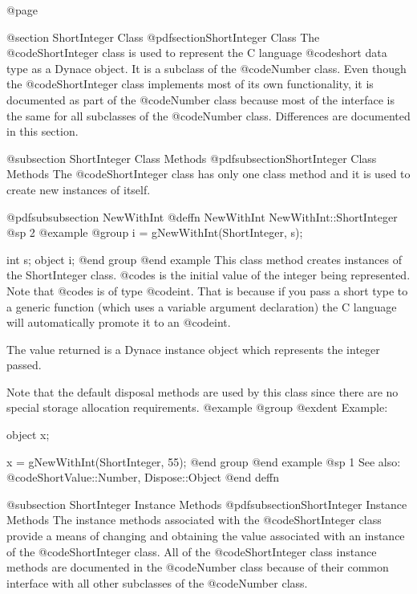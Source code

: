 @page

@section ShortInteger Class
@pdfsection{ShortInteger Class}
The @code{ShortInteger} class is used to represent the C language
@code{short} data type as a Dynace object.  It is a subclass of the
@code{Number} class.  Even though the @code{ShortInteger} class
implements most of its own functionality, it is documented as part of
the @code{Number} class because most of the interface is the same for
all subclasses of the @code{Number} class.  Differences are documented
in this section.


@subsection ShortInteger Class Methods
@pdfsubsection{ShortInteger Class Methods}
The @code{ShortInteger} class has only one class method and it is used
to create new instances of itself.



@pdfsubsubsection {NewWithInt}
@deffn {NewWithInt} NewWithInt::ShortInteger
@sp 2
@example
@group
i = gNewWithInt(ShortInteger, s);

int     s;
object  i;
@end group
@end example
This class method creates instances of the ShortInteger class.  @code{s}
is the initial value of the integer being represented.  Note that
@code{s} is of type @code{int}.  That is because if you pass a short
type to a generic function (which uses a variable argument declaration)
the C language will automatically promote it to an @code{int}.

The value returned is a Dynace instance object which represents the integer
passed.

Note that the default disposal methods are used by this class since
there are no special storage allocation requirements.
@example
@group
@exdent Example:

object  x;

x = gNewWithInt(ShortInteger, 55);
@end group
@end example
@sp 1
See also:  @code{ShortValue::Number, Dispose::Object}
@end deffn





@subsection ShortInteger Instance Methods
@pdfsubsection{ShortInteger Instance Methods}
The instance methods associated with the @code{ShortInteger} class
provide a means of changing and obtaining the value associated with an
instance of the @code{ShortInteger} class.  All of the
@code{ShortInteger} class instance methods are documented in the
@code{Number} class because of their common interface with all other
subclasses of the @code{Number} class.
















